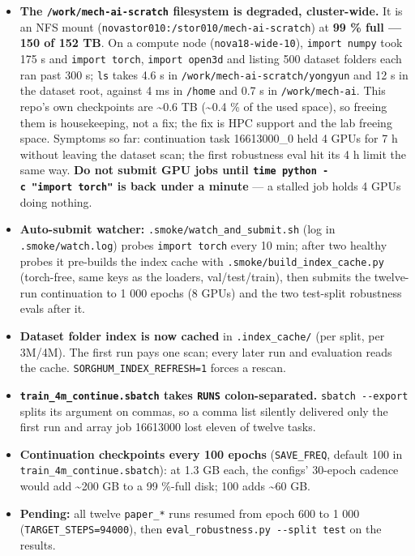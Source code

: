 \documentclass[
  10pt,
]{article}
\providecommand{\tightlist}{%
  \setlength{\itemsep}{0pt}\setlength{\parskip}{0pt}}
\begin{document}
\begin{itemize}
\tightlist
\item
  \textbf{The \texttt{/work/mech-ai-scratch} filesystem is degraded,
  cluster-wide.} It is an NFS mount
  (\texttt{novastor010:/stor010/}\allowbreak\texttt{mech-ai-scratch}) at
  \textbf{99 \% full --- 150 of 152 TB}. On a compute node
  (\texttt{nova18-wide-10}), \texttt{import\ numpy} took 175 s and
  \texttt{import\ torch}, \texttt{import\ open3d} and listing 500
  dataset folders each ran past 300 s; \texttt{ls} takes 4.6 s in
  \texttt{/work/mech-ai-scratch/yongyun} and 12 s in the dataset root,
  against 4 ms in \texttt{/home} and 0.7 s in \texttt{/work/mech-ai}.
  This repo's own checkpoints are \textasciitilde0.6 TB
  (\textasciitilde0.4 \% of the used space), so freeing them is
  housekeeping, not a fix; the fix is HPC support and the lab freeing
  space. Symptoms so far: continuation task 16613000\_0 held 4 GPUs for
  7 h without leaving the dataset scan; the first robustness eval hit
  its 4 h limit the same way. \textbf{Do not submit GPU jobs until
  \texttt{time\ python\ -c\ "import\ torch"} is back under a minute} ---
  a stalled job holds 4 GPUs doing nothing.
\item
  \textbf{Auto-submit watcher:} \texttt{.smoke/watch\_and\_submit.sh}
  (log in \texttt{.smoke/watch.log}) probes \texttt{import\ torch} every
  10 min; after two healthy probes it pre-builds the index cache with
  \texttt{.smoke/build\_index\_cache.py} (torch-free, same keys as the
  loaders, val/test/train), then submits the twelve-run continuation to
  1 000 epochs (8 GPUs) and the two test-split robustness evals after
  it.
\item
  \textbf{Dataset folder index is now cached} in \texttt{.index\_cache/}
  (per split, per 3M/4M). The first run pays one scan; every later run
  and evaluation reads the cache. \texttt{SORGHUM\_INDEX\_REFRESH=1}
  forces a rescan.
\item
  \textbf{\texttt{train\_4m\_continue.sbatch} takes \texttt{RUNS}
  colon-separated.} \texttt{sbatch\ -\/-export} splits its argument on
  commas, so a comma list silently delivered only the first run and
  array job 16613000 lost eleven of twelve tasks.
\item
  \textbf{Continuation checkpoints every 100 epochs}
  (\texttt{SAVE\_FREQ}, default 100 in
  \texttt{train\_4m\_continue.sbatch}): at 1.3 GB each, the configs'
  30-epoch cadence would add \textasciitilde200 GB to a 99 \%-full disk;
  100 adds \textasciitilde60 GB.
\item
  \textbf{Pending:} all twelve \texttt{paper\_*} runs resumed from epoch
  600 to 1 000 (\texttt{TARGET\_STEPS=94000}), then
  \texttt{eval\_robustness.py\ -\/-split\ test} on the results.
\end{itemize}
\end{document}
